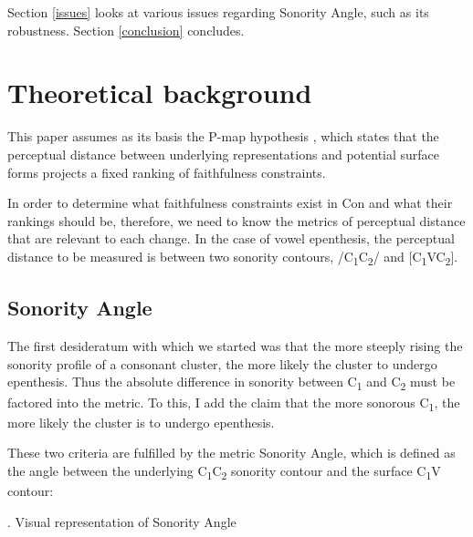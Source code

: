 \documentclass[12pt]{article}
\begin{document}
Section \ref{issues} looks at various issues regarding {\sc Sonority Angle}, such as its robustness. Section \ref{conclusion} concludes.

\section{Theoretical background} \label{theoreticalmachinery}

This paper assumes as its basis the P-map hypothesis \citep{steriade.2001}, which states that the perceptual distance between underlying representations and potential surface forms projects a fixed ranking of faithfulness constraints.

In order to determine what faithfulness constraints exist in {\sc Con} and what their rankings should be, therefore, we need to know the metrics of perceptual distance that are relevant to each change. In the case of vowel epenthesis, the perceptual distance to be measured is between two sonority contours, /C\textsubscript{1}C\textsubscript{2}/ and [C\textsubscript{1}VC\textsubscript{2}].

\subsection{Sonority Angle}

The first desideratum with which we started was that the more steeply rising the sonority profile of a consonant cluster, the more likely the cluster to undergo epenthesis. Thus the absolute difference in sonority between C\textsubscript{1} and C\textsubscript{2} must be factored into the metric. To this, I add the claim that the more sonorous C\textsubscript{1}, the more likely the cluster is to undergo epenthesis.

These two criteria are fulfilled by the metric {\sc Sonority Angle}, which is defined as the angle between the underlying C\textsubscript{1}C\textsubscript{2} sonority contour and the surface C\textsubscript{1}V contour:

\ex. Visual representation of {\sc Sonority Angle} \label{sonangle_picture} 

\vspace{-3em}
\begin{center}
\end{center}
\end{document}
